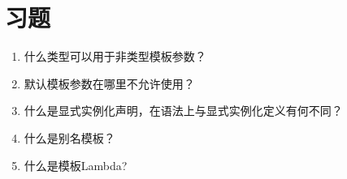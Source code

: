 \section{习题}
\begin{enumerate}
\item
什么类型可以用于非类型模板参数？

\item
默认模板参数在哪里不允许使用？

\item
什么是显式实例化声明，在语法上与显式实例化定义有何不同？

\item
什么是别名模板？

\item
什么是模板Lambda?
\end{enumerate}